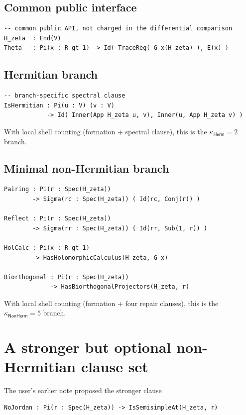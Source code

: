 \documentclass[11pt,a4paper]{article}
\theoremstyle{plain}
\theoremstyle{definition}
\theoremstyle{remark}
\newcommand{\effort}{\kappa}
\newcommand{\herm}{\ensuremath{\mathsf{Herm}}}
\newcommand{\nonherm}{\ensuremath{\mathsf{NonHerm}}}
\begin{document}
\subsection{Common public interface}

\begin{lstlisting}[language=MBTT]
-- common public API, not charged in the differential comparison
H_zeta  : End(V)
Theta   : Pi(x : R_gt_1) -> Id( TraceReg( G_x(H_zeta) ), E(x) )
\end{lstlisting}

\subsection{Hermitian branch}

\begin{lstlisting}[language=MBTT]
-- branch-specific spectral clause
IsHermitian : Pi(u : V) (v : V)
            -> Id( Inner(App H_zeta u, v), Inner(u, App H_zeta v) )
\end{lstlisting}

With local shell counting (formation + spectral clause), this is the $\effort_{\herm}=2$ branch.

\subsection{Minimal non-Hermitian branch}

\begin{lstlisting}[language=MBTT]
Pairing : Pi(r : Spec(H_zeta))
        -> Sigma(rc : Spec(H_zeta)) ( Id(rc, Conj(r)) )

Reflect : Pi(r : Spec(H_zeta))
        -> Sigma(rr : Spec(H_zeta)) ( Id(rr, Sub(1, r)) )

HolCalc : Pi(x : R_gt_1)
        -> HasHolomorphicCalculus(H_zeta, G_x)

Biorthogonal : Pi(r : Spec(H_zeta))
             -> HasBiorthogonalProjectors(H_zeta, r)
\end{lstlisting}

With local shell counting (formation + four repair clauses), this is the $\effort_{\nonherm}=5$ branch.

\section{A stronger but optional non-Hermitian clause set}

The user's earlier note proposed the stronger clause
\begin{lstlisting}[language=MBTT]
NoJordan : Pi(r : Spec(H_zeta)) -> IsSemisimpleAt(H_zeta, r)
\end{lstlisting}
\end{document}

